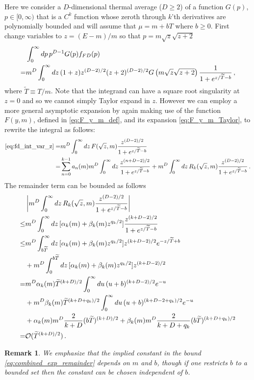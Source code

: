 \documentclass[sn-mathphys,Numbered]{sn-jnl}
\newtheorem{remark}{Remark}
\begin{document}
  Here we consider a $D$-dimensional thermal average ($D\geq 2$) of a function   $G(p)$, $p\in[0,\infty)$ that is a $C^k$ function whose zeroth through $k$'th derivatives are polynomially bounded and will assume that $\mu=m+bT$ where $b\geq 0$. First change variables to $z=(E-m)/m$ so that $p=m\sqrt{z}\sqrt{z+2}$
\begin{align}
&\int_0^\infty dp\, p^{D-1} G(p) f_{FD}(p)\notag\\
=&m^{D}\int_0^\infty dz\, (1+z) z^{(D-2)/2} (z+2)^{(D-2)/2} G\left(m\sqrt{z}\sqrt{z+2}\right) \frac{1}{1+e^{z/\widetilde{T}-b}}\,,\label{eq:fd_int_var_z}
\end{align}
where $\widetilde{T}\equiv T/m$.  Note that the integrand can have a square root singularity at $z=0$ and so we cannot simply Taylor expand in $z$.  However we can employ a more general asymptotic expansion  by again making use of the function $F(y,m)$, defined in \eqref{eq:F_y_m_def}, and its expansion \eqref{eq:F_y_m_Taylor}, to rewrite the integral as follows:
\begin{align}
    \eqref{eq:fd_int_var_z}=&m^{D}\int_0^\infty dz\, F(\sqrt{z},m)\frac{z^{(D-2)/2}}{1+e^{z/\widetilde{T}-b}}\\
    =&\sum_{n=0}^{k-1} a_n(m)m^{D}\int_0^\infty dz\,  \frac{z^{(n+D-2)/2}}{1+e^{z/\widetilde{T}-b}}+m^{D}\int_0^\infty dz\, R_k(\sqrt{z},m)\frac{z^{(D-2)/2}}{1+e^{z/\widetilde{T}-b}}\,.\notag
\end{align}
The remainder term can be bounded as follows
\begin{align}
 &\left|m^{D}\int_0^\infty dz\, R_k(\sqrt{z},m)\frac{z^{(D-2)/2}}{1+e^{z/\widetilde{T}-b}}\right|\\
 \leq&m^{D}\int_0^\infty dz\, [\alpha_k(m)+\beta_k(m)z^{q_k/2}]\frac{z^{(k+D-2)/2}}{1+e^{z/\widetilde{T}-b}}\notag\\
 \leq &m^{D}\int_{b\widetilde{T}}^\infty dz\, [\alpha_k(m)+\beta_k(m)z^{q_k/2}]z^{(k+D-2)/2}e^{-z/\widetilde{T}+b}\notag\\
 &+m^{D}\int_0^{{b\widetilde{T}}} dz\, [\alpha_k(m)+\beta_k(m)z^{q_k/2}]z^{(k+D-2)/2}\notag\\
 =&m^{D} \alpha_k(m)\widetilde{T}^{(k+D)/2}\int_{0}^\infty du\,(u+b)^{(k+D-2)/2}e^{-u}\notag\\
 &+m^D\beta_k(m)\widetilde{T}^{(k+D+q_k)/2}\int_{0}^\infty du\,(u+b)^{(k+D-2+q_k)/2}e^{-u}\notag\\
 &+\alpha_k(m)m^{D}\frac{2}{k+D}(b\widetilde{T})^{(k+D)/2}+\beta_k(m)m^{D}\frac{2}{k+D+q_k}(b\widetilde{T})^{(k+D+q_k)/2}\notag\\
 =&\mathcal{O}(\widetilde{T}^{(k+D)/2})\,.\label{eq:combined_exp_remainder}
\end{align}
\begin{remark}\label{remark:combined_remainder_uniform_in_b}
We emphasize that the implied constant in the bound \eqref{eq:combined_exp_remainder} depends on $m$ and $b$, though if one restricts $b$ to a bounded set then the constant can be chosen independent of $b$. 
\end{remark}
\end{document}
